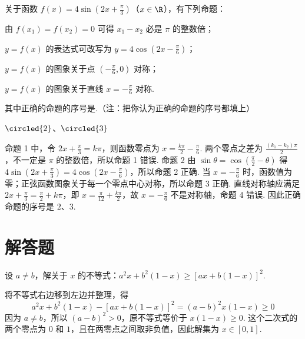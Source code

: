 \begin{problem}
关于函数 \(f(x)=4\sin \left(2x+\frac{\pi}{3}\right)\)（\(x\in\R\)），有下列命题：
\begin{circlelist}
\item 由 \(f(x_{1}) = f(x_{2}) = 0\) 可得 \(x_{1} - x_{2}\) 必是 \(\pi\) 的整数倍；
\item \(y = f(x)\) 的表达式可改写为 \(y = 4\cos \left(2x - \frac{\pi}{6}\right)\)；
\item \(y = f(x)\) 的图象关于点 \(\left(-\frac{\pi}{6},0\right)\) 对称；
\item \(y = f(x)\) 的图象关于直线 \(x = -\frac{\pi}{6}\) 对称.
\end{circlelist}
其中正确的命题的序号是\fillinblank{}.（注：把你认为正确的命题的序号都填上）
\end{problem}

\begin{answer}
\(\circled{2}\)、\(\circled{3}\)
\end{answer}

\begin{solution}
命题 1 中，令 \(2x+\frac{\pi}{3}=k\pi\)，则函数零点为 \(x=\frac{k\pi}{2}-\frac{\pi}{6}\). 两个零点之差为 \(\frac{(k_1-k_2)\pi}{2}\)，不一定是 \(\pi\) 的整数倍，所以命题 1 错误. 命题 2 由 \(\sin\theta=\cos\left(\frac{\pi}{2}-\theta\right)\) 得 \(4\sin\left(2x+\frac{\pi}{3}\right)=4\cos\left(2x-\frac{\pi}{6}\right)\)，所以命题 2 正确. 当 \(x=-\frac{\pi}{6}\) 时，函数值为零；正弦函数图象关于每一个零点中心对称，所以命题 3 正确. 直线对称轴应满足 \(2x+\frac{\pi}{3}=\frac{\pi}{2}+k\pi\)，即 \(x=\frac{\pi}{12}+\frac{k\pi}{2}\)，故 \(x=-\frac{\pi}{6}\) 不是对称轴，命题 4 错误. 因此正确命题的序号是 \(2\)、\(3\).
\end{solution}

\section{解答题}

\begin{problem}
设 \(a \neq b\)，解关于 \(x\) 的不等式：\(a^2 x + b^2 (1 - x) \geqslant [a x + b(1 - x)]^2\).
\end{problem}

\begin{solution}
将不等式右边移到左边并整理，得
\[
a^2x+b^2(1-x)-\left[ax+b(1-x)\right]^2=(a-b)^2x(1-x)\geqslant0
\]
因为 \(a\neq b\)，所以 \((a-b)^2>0\)，原不等式等价于 \(x(1-x)\geqslant0\). 这个二次式的两个零点为 \(0\) 和 \(1\)，且在两零点之间取非负值，因此解集为 \(x\in[0,1]\).
\end{solution}

